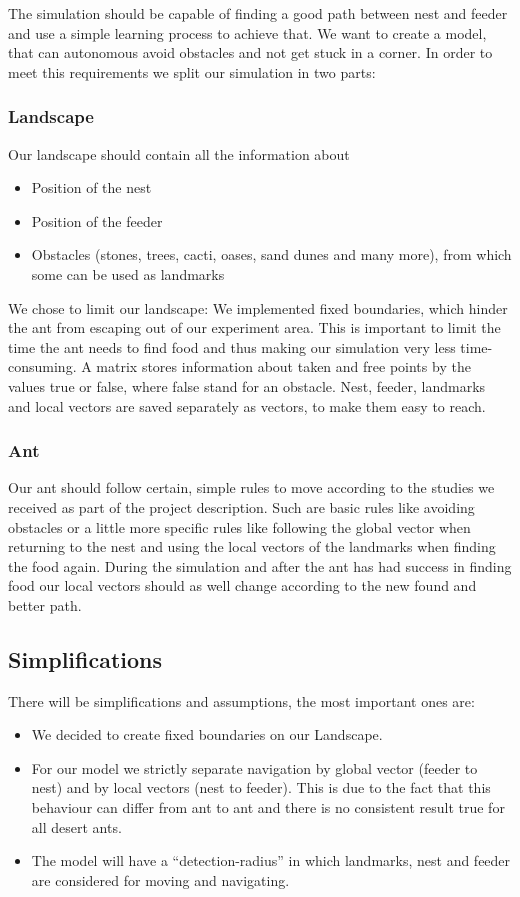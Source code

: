 \documentclass[11pt]{article}
\begin{document}
The simulation should be capable of finding a good path between nest and feeder and use a simple learning process to achieve that. We want to create a model, that can autonomous avoid obstacles and not get stuck in a corner. In order to meet this requirements we split our simulation in two parts:

\subsubsection*{Landscape}
Our landscape should contain all the information about
\begin{itemize}

\item Position of the nest
\item Position of the feeder
\item Obstacles (stones, trees, cacti, oases, sand dunes and many more), from which some can be used as landmarks
\end{itemize}

We chose to limit our landscape: We implemented fixed boundaries, which hinder the ant from escaping out of our experiment area. This is important to limit the time the ant needs to find food and thus making our simulation very less time-consuming. A matrix stores information about taken and free points by the values true or false, where false stand for an obstacle. Nest, feeder, landmarks and local vectors are saved separately as vectors, to make them easy to reach.

\subsubsection*{Ant}
Our ant should follow certain, simple rules to move according to the studies we received as part of the project description. Such are basic rules like avoiding obstacles or a little more specific rules like following the global vector when returning to the nest and using the local vectors of the landmarks when finding the food again. During the simulation and after the ant has had success in finding food our local vectors should as well change according to the new found and better path.

\subsection{Simplifications}
There will be simplifications and assumptions, the most important ones are:
\begin{itemize}
\item We decided to create fixed boundaries on our Landscape.
\item For our model we strictly separate navigation by global vector (feeder to nest) and by local vectors (nest to feeder). This is due to the fact that this behaviour can differ from ant to ant and there is no consistent result true for all desert ants.
\item The model will have a “detection-radius” in which landmarks, nest and feeder are considered for moving and navigating.
\end{itemize}
\newpage
\end{document}
